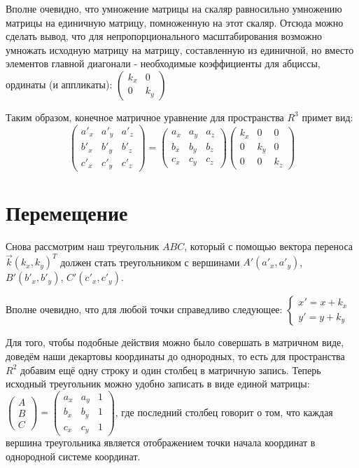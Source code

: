 \documentclass [12pt, a4paper] {article}
\begin{document}
Вполне очевидно, что умножение матрицы на скаляр равносильно умножению матрицы на единичную матрицу, помноженную на этот скаляр. Отсюда можно сделать вывод, что для непропорционального масштабирования возможно умножать исходную матрицу на матрицу, составленную из единичной, но вместо элементов главной диагонали - необходимые коэффициенты для абциссы, ординаты (и аппликаты): $\begin {pmatrix} k_x & 0 \\ 0 & k_y \end {pmatrix}$

Таким образом, конечное матричное уравнение для пространства $R^3$ примет вид:
\begin {equation} \label {eq:scale}
	\begin {pmatrix}
		a'_x & a'_y & a'_z \\
		b'_x & b'_y & b'_z \\
		c'_x & c'_y & c'_z
	\end {pmatrix} = \begin {pmatrix}
		a_x & a_y & a_z \\
		b_x & b_y & b_z \\
		c_x & c_y & c_z
	\end {pmatrix} \begin {pmatrix}
		k_x & 0 & 0 \\
		0 & k_y & 0 \\
		0 & 0 & k_z
	\end {pmatrix}
\end {equation}

\section {Перемещение}
Снова рассмотрим наш треугольник $ABC$, который с помощью вектора переноса $\overrightarrow{k}(k_x, k_y)^T$ должен стать треугольником с вершинами $A'(a'_x, a'_y)$, $B'(b'_x, b'_y)$, $C'(c'_x, c'_y)$.

Вполне очевидно, что для любой точки справедливо следующее:
$\left\{
	\begin {aligned}
		x' = x + k_x\\
		y' = y + k_y
	\end {aligned}
\right.$

Для того, чтобы подобные действия можно было совершать в матричном виде, доведём наши декартовы координаты до однородных, то есть для пространства $R^2$ добавим ещё одну строку и один столбец в матричную запись. Теперь исходный треугольник можно удобно записать в виде единой матрицы:
$\begin {pmatrix}
	A\\
	B\\
	C
\end {pmatrix} = \begin {pmatrix}
	a_x & a_y & 1\\
	b_x & b_y & 1\\
	c_x & c_y & 1
\end {pmatrix}$,
где последний столбец говорит о том, что каждая вершина треугольника является отображением точки начала координат в однородной системе координат.
\end{document}
